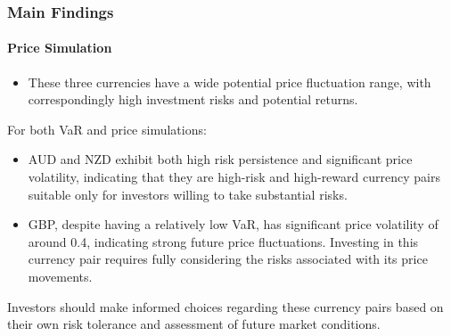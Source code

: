 \documentclass[10pt]{beamer}
\begin{document}
\begin{frame}
\frametitle{Main Findings}
\framesubtitle{Price Simulation}
\begin{itemize}
    \item These three currencies have a wide potential price fluctuation range, with correspondingly high investment risks and potential returns.
\end{itemize}
For both VaR and price simulations:
\begin{itemize}
    \item AUD and NZD exhibit both high risk persistence and significant price volatility, indicating that they are high-risk and high-reward currency pairs suitable only for investors willing to take substantial risks.
    \item GBP, despite having a relatively low VaR, has significant price volatility of around 0.4, indicating strong future price fluctuations. Investing in this currency pair requires fully considering the risks associated with its price movements.
\end{itemize}
Investors should make informed choices regarding these currency pairs based on their own risk tolerance and assessment of future market conditions.
\end{frame}
\end{document}
